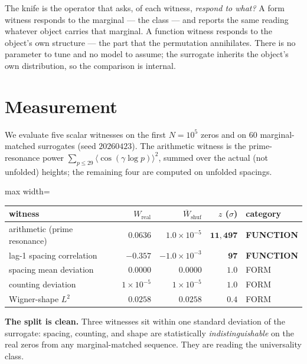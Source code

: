 \documentclass[11pt]{article}
\begin{document}
The knife is the operator that asks, of each witness, \emph{respond to what?} A form witness responds to the marginal --- the class --- and reports the same reading whatever object carries that marginal. A function witness responds to the object's own structure --- the part that the permutation annihilates. There is no parameter to tune and no model to assume; the surrogate inherits the object's own distribution, so the comparison is internal.

\section{Measurement}\label{sec:meas}

We evaluate five scalar witnesses on the first $N=10^5$ zeros and on $60$ marginal-matched surrogates (seed $20260423$). The arithmetic witness is the prime-resonance power $\sum_{p\le29}\langle\cos(\gamma\log p)\rangle^2$, summed over the actual (not unfolded) heights; the remaining four are computed on unfolded spacings.

\begin{center}
\begin{adjustbox}{max width=\linewidth}\begin{tabular}{lrrrl}
\toprule
witness & $W_{\mathrm{real}}$ & $\overline{W}_{\mathrm{shuf}}$ & $z$ ($\sigma$) & category \\
\midrule
arithmetic (prime resonance) & $0.0636$ & $1.0\times10^{-5}$ & $\mathbf{11{,}497}$ & \textbf{FUNCTION} \\
lag-1 spacing correlation     & $-0.357$ & $-1.0\times10^{-3}$ & $\mathbf{97}$ & \textbf{FUNCTION} \\
spacing mean deviation        & $0.0000$ & $0.0000$ & $1.0$ & FORM \\
counting deviation            & $1\times10^{-5}$ & $1\times10^{-5}$ & $1.0$ & FORM \\
Wigner-shape $L^2$            & $0.0258$ & $0.0258$ & $0.4$ & FORM \\
\bottomrule
\end{tabular}\end{adjustbox}
\end{center}

\noindent\textbf{The split is clean.} Three witnesses sit within one standard deviation of the surrogate: spacing, counting, and shape are statistically \emph{indistinguishable} on the real zeros from any marginal-matched sequence. They are reading the universality class.
\end{document}
